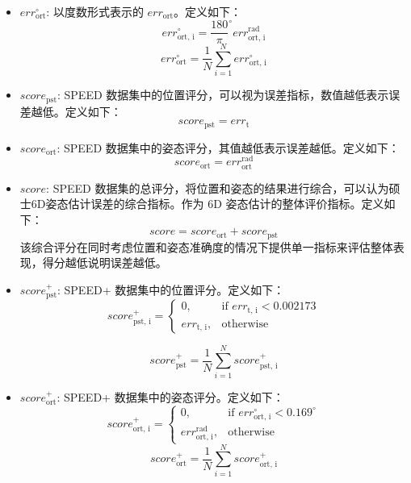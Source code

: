 \begin{itemize}
	\item $err_{\text{ort}}^{\circ}$: 以度数形式表示的 $err_{\text{ort}}$。定义如下：
	\begin{equation}
		err_{\text{ort, i}}^{\circ} =  \frac{180}{\pi}^{\circ} err_{\text{ort, i}}^{\text{rad}}
	\end{equation}
	\begin{equation}
		err_{\text{ort}}^{\circ} = \frac{1}{N}\sum\limits_{i=1}^N err_{\text{ort, i}}^{\circ}
	\end{equation}
	
	\item $score_{\text{pst}}$: SPEED 数据集中的位置评分，可以视为误差指标，数值越低表示误差越低。定义如下：
	\begin{equation}
		score_{\text{pst}} = err_{\text{t}}
	\end{equation}
	
	\item $score_{\text{ort}}$: SPEED 数据集中的姿态评分，其值越低表示误差越低。定义如下：
	\begin{equation}
		score_{\text{ort}} = err_{\text{ort}}^{\text{rad}}
	\end{equation}
	
	\item $score$: SPEED 数据集的总评分，将位置和姿态的结果进行综合，可以认为硕士6D姿态估计误差的综合指标。作为 6D 姿态估计的整体评价指标。定义如下：
	\begin{equation}
		score = score_{\text{ort}} + score_{\text{pst}}
	\end{equation}
	该综合评分在同时考虑位置和姿态准确度的情况下提供单一指标来评估整体表现，得分越低说明误差越低。
	
	\item $score_{\text{pst}}^+$: SPEED+ 数据集中的位置评分。定义如下：
	\begin{equation}
		score_{\text{pst, i}}^+ = 
		\begin{cases}
			0, & \text{if } err_{\text{t, i}} < 0.002173 \\
			err_{\text{t, i}}, & \text{otherwise}
		\end{cases}
	\end{equation}
	
	\begin{equation}
		score_{\text{pst}}^+ = \frac{1}{N}\sum\limits_{i=1}^N score_{\text{pst, i}}^+
	\end{equation}
	
	\item $score_{\text{ort}}^+$: SPEED+ 数据集中的姿态评分。定义如下：
	\begin{equation}
		score_{\text{ort, i}}^+ = 
		\begin{cases}
			0, & \text{if } err_{\text{ort, i}}^{\circ} < 0.169^\circ \\
			err_{\text{ort, i}}^{\text{rad}}, & \text{otherwise}
		\end{cases}
	\end{equation}
	\begin{equation}
		score_{\text{ort}}^+ = \frac{1}{N}\sum\limits_{i=1}^N score_{\text{ort, i}}^+
	\end{equation}
	

\end{itemize}
